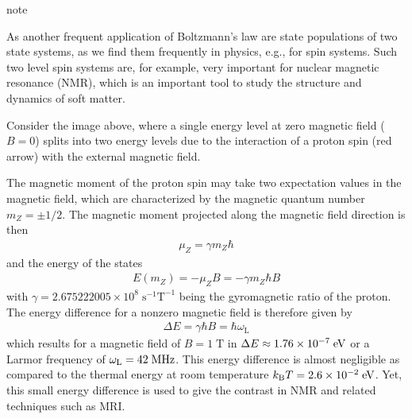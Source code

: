 \documentclass[letterpaper,10pt,english]{sphinxmanual}
\let\sphinxpxdimen\pdfpxdimen\else\newdimen\sphinxpxdimen
\begin{document}
\begin{sphinxadmonition}{note}{}\unskip
\sphinxAtStartPar
{}

\sphinxAtStartPar
As another frequent application of Boltzmann’s law are state populations of two state systems, as we find them frequently in physics, e.g., for spin systems. Such two level spin systems are, for example, very important for nuclear magnetic resonance (NMR), which is an important tool to study the structure and dynamics of soft matter.

\noindent\sphinxincludegraphics[width=438\sphinxpxdimen,height=358\sphinxpxdimen]{{two_level}.png}

\sphinxAtStartPar
Consider the image above, where a single energy level at zero magnetic field (\(B=0\)) splits into two energy levels due to the interaction of a proton spin (red arrow) with the external magnetic field.

\sphinxAtStartPar
The magnetic moment of the proton spin may take two expectation values in the magnetic field, which are characterized by the magnetic quantum number \(m_Z=\pm 1/2\). The magnetic moment projected along the magnetic field direction is then
\begin{equation*}
\begin{split}\mu_Z=\gamma m_Z \hbar\end{split}
\end{equation*}
\sphinxAtStartPar
and the energy of the states
\begin{equation*}
\begin{split}E(m_Z)=-\mu_Z B=-\gamma m_Z \hbar B\end{split}
\end{equation*}
\sphinxAtStartPar
with \(\gamma=2.675222005\times 10^{8}\; \mathrm{s}^{-1} \mathrm{T}^{-1}\) being the gyromagnetic ratio of the proton. The energy difference for a nonzero magnetic field is therefore given by
\begin{equation*}
\begin{split}\Delta E=\gamma \hbar B=\hbar \omega_\mathrm{L}\end{split}
\end{equation*}
\sphinxAtStartPar
which results for a magnetic field of \(B=1\; \mathrm{T}\) in \(\Delta E\approx 1.76\times 10^{-7}\;{\rm eV}\) or a Larmor frequency of \(\omega_\mathrm{L}=42\; {\rm MHz}\). This energy difference is almost negligible as compared to the thermal energy at room temperature \(k_\mathrm{B}T=2.6\times 10^{-2}\;{\rm eV}\). Yet, this small energy difference is used to give the contrast in NMR and related techniques such as MRI.


\end{sphinxadmonition}
\end{document}
